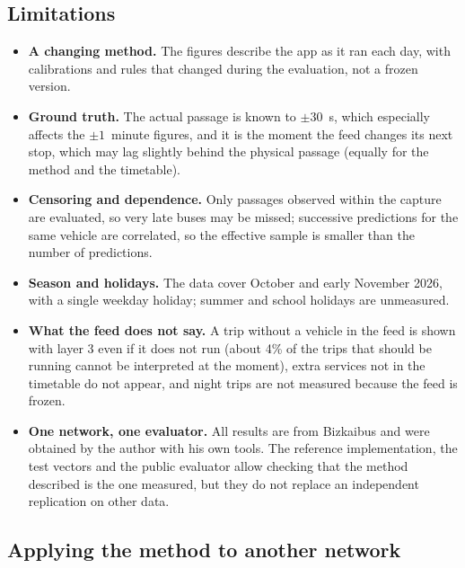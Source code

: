 \subsection{Limitations}
\label{sec:limitations}

\begin{itemize}
  \item \textbf{A changing method.} The figures describe the app as it ran each day, with calibrations and rules that
        changed during the evaluation, not a frozen version.
  \item \textbf{Ground truth.} The actual passage is known to $\pm30$~s, which especially affects the $\pm1$~minute
        figures, and it is the moment the feed changes its next stop, which may lag slightly behind the physical passage
        (equally for the method and the timetable).
  \item \textbf{Censoring and dependence.} Only passages observed within the capture are evaluated, so very late buses
        may be missed; successive predictions for the same vehicle are correlated, so the effective sample is smaller
        than the number of predictions.
  \item \textbf{Season and holidays.} The data cover October and early November 2026, with a single weekday holiday;
        summer and school holidays are unmeasured.
  \item \textbf{What the feed does not say.} A trip without a vehicle in the feed is shown with layer 3 even if it does
        not run (about 4\% of the trips that should be running cannot be interpreted at the moment), extra services
        not in the timetable do not appear, and night trips are not measured because the feed is frozen.
  \item \textbf{One network, one evaluator.} All results are from Bizkaibus and were obtained by the author with his own
        tools. The reference implementation, the test vectors and the public evaluator allow checking that the method
        described is the one measured, but they do not replace an independent replication on other data.
\end{itemize}

\subsection{Applying the method to another network}
\label{sec:other-networks}

